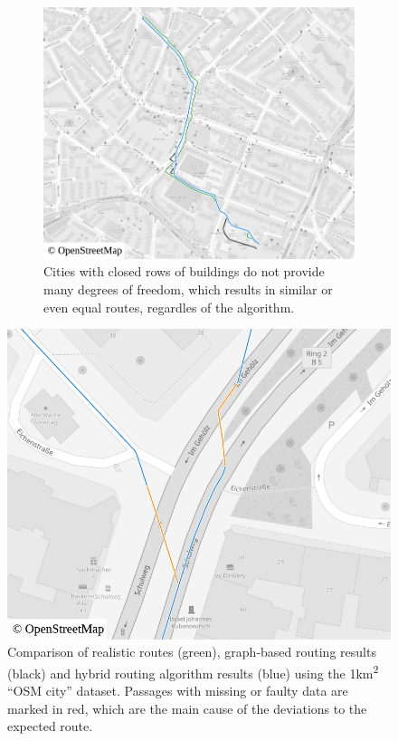 \begin{figure}[h!]
\begin{minipage}[t]{.48\textwidth}
\begin{subfigure}[t]{\linewidth}
\begin{figcenter}
							\includegraphics[width=\textwidth]{images/qgis-routing-city-routing-18}
						\end{figcenter}
						\caption{Cities with closed rows of buildings do not provide many degrees of freedom, which results in similar or even equal routes, regardles of the algorithm.}
						\label{fig:eval-city-usefulness-d}
					\end{subfigure}
				\end{minipage}
				\caption{Comparison of realistic routes (green), graph-based routing results (black) and hybrid routing algorithm results (blue) using the 1km\textsuperscript{2} \enquote{OSM city} dataset. Passages with missing or faulty data are marked in red, which are the main cause of the deviations to the expected route.}
				\label{fig:eval-city-usefulness}
				\begin{minipage}[t]{.48\textwidth}
					\begin{figcenter}
						\includegraphics[width=\textwidth]{images/qgis-routing-city-roads}

\end{figcenter}
\end{minipage}
\end{figure}
